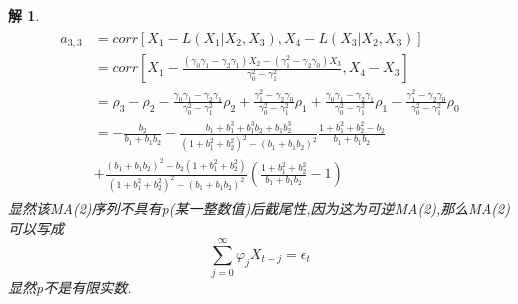 \documentclass[11pt,a4paper]{ctexart}
\newtheorem*{solution}{解}
\begin{document}
\begin{enumerate}
\begin{solution}
\begin{equation}
	\begin{aligned}
	\begin{split}
		a_{3,3}
		&=corr[X_1-L(X_1|X_2,X_3),X_4-L(X_3|X_2,X_3)]\\
		&=corr[X_1-\frac{(\gamma_0\gamma_1-\gamma_2\gamma_1)X_2-(\gamma_1^2-\gamma_2\gamma_0)X_3}{\gamma_0^2-\gamma_1^2},X_4-X_3]\\
		&=\rho_3-\rho_2
		-\frac{\gamma_0\gamma_1-\gamma_2\gamma_1}{\gamma_0^2-\gamma_1^2}\rho_2
		+\frac{\gamma_1^2-\gamma_2\gamma_0}{\gamma_0^2-\gamma_1^2}\rho_1
		+\frac{\gamma_0\gamma_1-\gamma_2\gamma_1}{\gamma_0^2-\gamma_1^2}\rho_1
		-\frac{\gamma_1^2-\gamma_2\gamma_0}{\gamma_0^2-\gamma_1^2}\rho_0\\
		&= -\frac{b_2}{b_1+b_1b_2}-\frac{b_1+b_1^3+b_1^3b_2+b_1b_2^3}{(1+b_1^2+b_2^2)^2-(b_1+b_1b_2)^2}\frac{1+b_1^2+b_2^2-b_2}{b_1+b_1b_2}\\
		&+\frac{(b_1+b_1b_2)^2-b_2(1+b_1^2+b_2^2)}{(1+b_1^2+b_2^2)^2-(b_1+b_1b_2)^2}
		(\frac{1+b_1^2+b_2^2}{b_1+b_1b_2}-1)
	\end{split}
	\end{aligned} 
\end{equation}
显然该MA(2)序列不具有p(某一整数值)后截尾性,因为这为可逆MA(2),那么MA(2)可以写成
\begin{equation}
	\sum_{j=0}^{\infty}\varphi_jX_{t-j}=\epsilon_t
\end{equation}
显然p不是有限实数.
\end{solution}

\end{enumerate}
\end{document}
